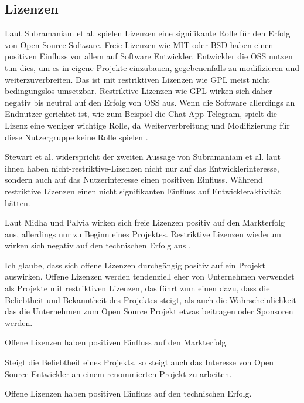 \subsection{Lizenzen}

Laut Subramaniam et al. spielen Lizenzen eine signifikante Rolle für den Erfolg von 
Open Source Software.
Freie Lizenzen wie MIT oder BSD haben einen positiven Einfluss vor allem auf Software Entwickler.
Entwickler die OSS nutzen tun dies, um es in eigene Projekte einzubauen, gegebenenfalls zu modifizieren
und weiterzuverbreiten. Das ist mit restriktiven Lizenzen wie GPL meist nicht bedingungslos umsetzbar.
Restriktive Lizenzen wie GPL wirken sich daher negativ bis neutral auf den Erfolg von OSS aus.
Wenn die Software allerdings an Endnutzer
gerichtet ist, wie zum Beispiel die Chat-App Telegram, spielt die Lizenz eine weniger wichtige Rolle, 
da Weiterverbreitung und Modifizierung für diese Nutzergruppe keine Rolle spielen 
\cite{subramaniamDeterminantsOpenSource2009}.

Stewart et al. widerspricht der zweiten Aussage von Subramaniam et al. laut ihnen
haben nicht-restriktive-Lizenzen nicht nur auf das Entwicklerinteresse, sondern auch auf das 
Nutzerinteresse einen positiven Einfluss. %
Während restriktive Lizenzen einen nicht signifikanten Einfluss auf
Entwickleraktivität hätten. \cite{stewartImpactsLicenseChoice2006a}


Laut Midha und Palvia wirken sich freie Lizenzen positiv auf den Markterfolg aus, allerdings
nur zu Beginn eines Projektes. %
Restriktive Lizenzen wiederum wirken sich negativ auf den technischen Erfolg aus %
\cite{midhaFactorsAffectingSuccess2012}.


Ich glaube, dass sich offene Lizenzen durchgängig positiv auf ein Projekt auswirken. 
Offene Lizenzen werden tendenziell eher von Unternehmen verwendet als Projekte mit restriktiven
Lizenzen, das führt zum einen dazu, dass die Beliebtheit und Bekanntheit des Projektes steigt, als
auch die Wahrscheinlichkeit das die Unternehmen zum Open Source Projekt etwas beitragen oder 
Sponsoren werden.

\begin{hypothesis}
    Offene Lizenzen haben positiven Einfluss auf den Markterfolg.
\end{hypothesis}

\noindent
Steigt die Beliebtheit eines Projekts, so steigt auch das Interesse von Open Source Entwickler an einem renommierten 
Projekt zu arbeiten.

\begin{hypothesis}
    Offene Lizenzen haben positiven Einfluss auf den technischen Erfolg.
\end{hypothesis}
